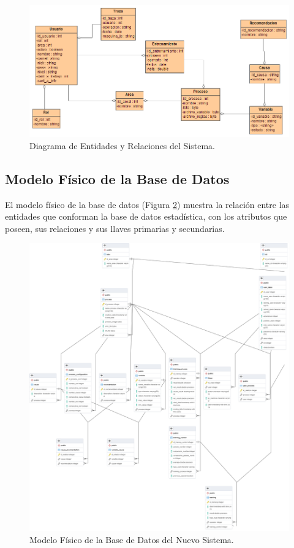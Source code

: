 \begin{figure}[h]
\centering
 \includegraphics[width=0.7\linewidth]{imagen/der.png}
 \caption{Diagrama de Entidades y Relaciones del Sistema.}
 \label{fig:der} 
\end{figure}

\subsection{Modelo Físico de la Base de Datos}
El modelo físico de la base de datos (Figura \ref{fig:baseD}) muestra la relación entre las entidades que conforman la base de datos estadística, con los atributos que poseen, sus relaciones y sus llaves primarias y secundarias.

\begin{figure}[h]
\centering
 \includegraphics[width=1\linewidth]{imagen/baseD.png}
 \caption{Modelo Físico de la Base de Datos del Nuevo Sistema.}
 \label{fig:baseD} 
\end{figure}


